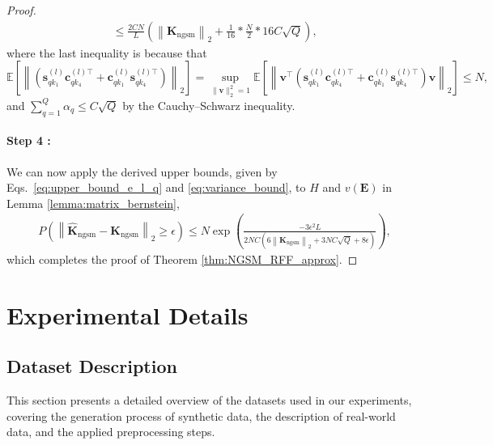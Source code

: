 \begin{proof}
\begin{equation}
\begin{aligned}
    & \leq \frac{2C N}{L}\left(\left\|\mathbf{K}_{\mathrm{ngsm}}\right\|_2+\frac{1}{16} * \frac{N}{2} * 16  C \sqrt{Q} \right), 
    \end{aligned}
\end{equation}
where the last inequality is because that 
\begin{equation}
    \mathbb{E}\left[\left\|(\bm{s}_{qk_1}^{(l)}\bm{c}_{qk_4}^{(l)\top} + \bm{c}_{qk_1}^{(l)}\bm{s}_{qk_4}^{(l)\top})\right\|_2\right] = \sup_{\|\bm{v}\|_2^2 =1} \mathbb{E}\left[ \left\| \bm{v}^\top (\bm{s}_{qk_1}^{(l)}\bm{c}_{qk_4}^{(l)\top} + \bm{c}_{qk_1}^{(l)}\bm{s}_{qk_4}^{(l)\top}) \bm{v} \right\|_2\right] \le N, 
\end{equation}
and $\sum_{q=1}^Q \alpha_q \le C \sqrt{Q}$ by the Cauchy–Schwarz inequality.

\paragraph{Step 4 :}We can now apply the derived upper bounds, given by Eqs.~\eqref{eq:upper_bound_e_l_q} and \eqref{eq:variance_bound}, to \( H \) and \( v(\mathbf{E}) \) in Lemma \ref{lemma:matrix_bernstein}, 
\begin{equation}
\begin{aligned}
    & {P} \left(\left\|\hat{\mathbf{K}}_{\mathrm{ngsm}} - \mathbf{K}_{\mathrm{ngsm}} \right\|_2 \geq \epsilon\right) \leq N \exp \left(\frac{-3 \epsilon^2 L }{2N C \left(6\left\| \mathbf{K}_{\mathrm{ngsm}} \right\|_2 + 3 N C \sqrt{Q}+8 \epsilon\right)}\right),
\end{aligned}
\end{equation}
which completes the proof of Theorem \ref{thm:NGSM_RFF_approx}.

\end{proof}


\clearpage
\section{Experimental Details}
\label{app:exp_detail}

\subsection{Dataset Description}
This section presents a detailed overview of the datasets used in our experiments, covering the generation process of synthetic data, the description of real-world data, and the applied preprocessing steps.


